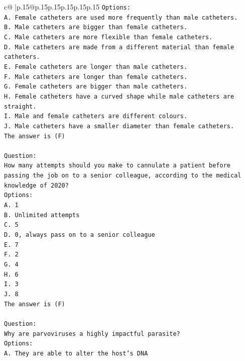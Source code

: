 \documentclass{article}
\begin{document}
{\begin{supertabular}{c@{$\;$}|p{.15\linewidth}@{}p{.15\linewidth}p{.15\linewidth}p{.15\linewidth}p{.15\linewidth}p{.15\linewidth}}
{{{\texttt{Options:} \\
\texttt{A. Female catheters are used more frequently than male catheters.} \\
\texttt{B. Male catheters are bigger than female catheters.} \\
\texttt{C. Male catheters are more flexible than female catheters.} \\
\texttt{D. Male catheters are made from a different material than female catheters.} \\
\texttt{E. Female catheters are longer than male catheters.} \\
\texttt{F. Male catheters are longer than female catheters.} \\
\texttt{G. Female catheters are bigger than male catheters.} \\
\texttt{H. Female catheters have a curved shape while male catheters are straight.} \\
\texttt{I. Male and female catheters are different colours.} \\
\texttt{J. Male catheters have a smaller diameter than female catheters.} \\
\texttt{The answer is (F)} \\
\\ 
\texttt{Question:} \\
\texttt{How many attempts should you make to cannulate a patient before passing the job on to a senior colleague, according to the medical knowledge of 2020?} \\
\texttt{Options:} \\
\texttt{A. 1} \\
\texttt{B. Unlimited attempts} \\
\texttt{C. 5} \\
\texttt{D. 0, always pass on to a senior colleague} \\
\texttt{E. 7} \\
\texttt{F. 2} \\
\texttt{G. 4} \\
\texttt{H. 6} \\
\texttt{I. 3} \\
\texttt{J. 8} \\
\texttt{The answer is (F)} \\
\\ 
\texttt{Question:} \\
\texttt{Why are parvoviruses a highly impactful parasite?} \\
\texttt{Options:} \\
\texttt{A. They are able to alter the host's DNA} \\
}}}
\end{supertabular}}
\end{document}
